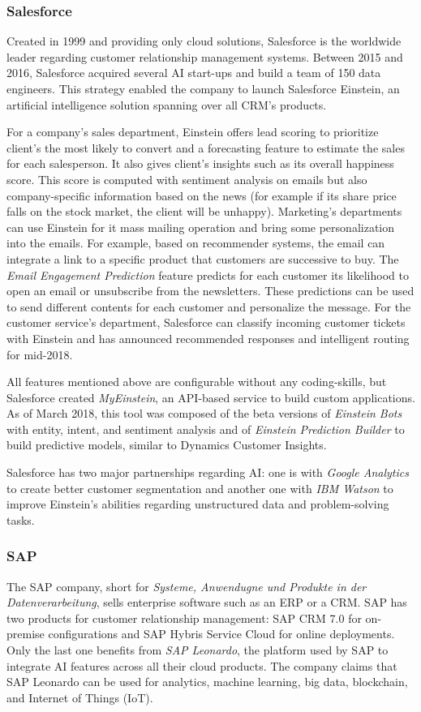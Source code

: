\subsubsection*{Salesforce}
Created in 1999 and providing only cloud solutions, Salesforce is the worldwide leader regarding customer relationship management systems. Between 2015 and 2016, Salesforce acquired several AI start-ups and build a team of 150 data engineers. This strategy enabled the company to launch Salesforce Einstein, an artificial intelligence solution spanning over all CRM's products.

For a company's sales department, Einstein offers lead scoring to prioritize client's the most likely to convert and a forecasting feature to estimate the sales for each salesperson. It also gives client's insights such as its overall happiness score. This score is computed with sentiment analysis on emails but also company-specific information based on the news (for example if its share price falls on the stock market, the client will be unhappy). Marketing's departments can use Einstein for it mass mailing operation and bring some personalization into the emails. For example, based on recommender systems, the email can integrate a link to a specific product that customers are successive to buy. The \textit{Email Engagement Prediction} feature predicts for each customer its likelihood to open an email or unsubscribe from the newsletters. These predictions can be used to send different contents for each customer and personalize the message. For the customer service's department, Salesforce can classify incoming customer tickets with Einstein and has announced recommended responses and intelligent routing for mid-2018.

All features mentioned above are configurable without any coding-skills, but Salesforce created \textit{MyEinstein}, an API-based service to build custom applications. As of March 2018, this tool was composed of the beta versions of \textit{Einstein Bots} with entity, intent, and sentiment analysis and of \textit{Einstein Prediction Builder} to build predictive models, similar to Dynamics Customer Insights.

Salesforce has two major partnerships regarding AI: one is with \textit{Google Analytics} to create better customer segmentation and another one with \textit{IBM Watson} to improve Einstein's abilities regarding unstructured data and problem-solving tasks.

\subsubsection*{SAP}
The SAP company, short for \textit{Systeme, Anwendugne und Produkte in der Datenverarbeitung}, sells enterprise software such as an ERP or a CRM. SAP has two products for customer relationship management: SAP CRM 7.0 for on-premise configurations and SAP Hybris Service Cloud for online deployments. Only the last one benefits from \textit{SAP Leonardo}, the platform used by SAP to integrate AI features across all their cloud products. The company claims that SAP Leonardo can be used for analytics, machine learning, big data, blockchain, and Internet of Things (IoT).

